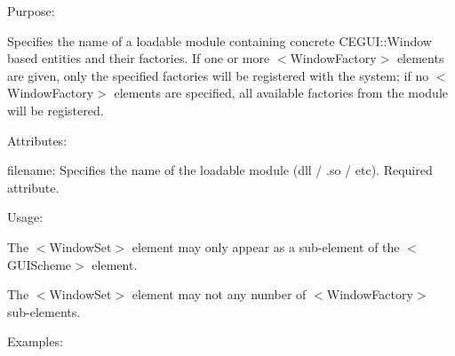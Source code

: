 \begin{DoxyItemize}
\item Purpose\+:
\begin{DoxyItemize}
\item Specifies the name of a loadable module containing concrete C\+E\+G\+U\+I\+::\+Window based entities and their factories. If one or more $<$Window\+Factory$>$ elements are given, only the specified factories will be registered with the system; if no $<$Window\+Factory$>$ elements are specified, all available factories from the module will be registered.
\end{DoxyItemize}
\item Attributes\+:
\begin{DoxyItemize}
\item {\ttfamily filename\+:} Specifies the name of the loadable module (dll / .so / etc). Required attribute.
\end{DoxyItemize}
\item Usage\+:
\begin{DoxyItemize}
\item The $<$Window\+Set$>$ element may only appear as a sub-\/element of the $<$G\+U\+I\+Scheme$>$ element.
\item The $<$Window\+Set$>$ element may not any number of $<$Window\+Factory$>$ sub-\/elements.
\end{DoxyItemize}
\item Examples\+: 
\end{DoxyItemize}